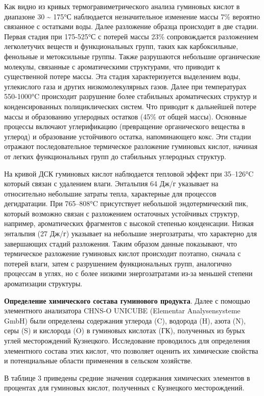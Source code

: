 \begin{multicols}{2}
Как видно из кривых термогравиметрического анализа гуминовых кислот в
диапазоне 30 \textasciitilde{} 175°С наблюдается незначительное
изменение массы 7\% вероятно связанное с остатками воды. Далее
разложение образца происходит в две стадии. Первая стадия при 175-525°С
с потерей массы 23\% сопровождается разложением легколетучих веществ и
функциональных групп, таких как карбоксильные, фенольные и метоксильные
группы. Также разрушаются небольшие органические молекулы, связанные с
ароматическими структурами, что приводит к существенной потере массы.
Эта стадия характеризуется выделением воды, углекислого газа и других
низкомолекулярных газов. Далее при температурах 550-1000°C происходит
разрушение более стабильных ароматических структур и конденсированных
полициклических систем. Что приводит к дальнейшей потере массы и
образованию углеродных остатков (45\% от общей массы). Основные процессы
включают углерификацию (превращение органического вещества в углерод) и
образование устойчивого остатка, напоминающего кокс. Эти стадии отражают
последовательное термическое разложение гуминовых кислот, начиная от
легких функциональных групп до стабильных углеродных структур.

На кривой ДСК гуминовых кислот наблюдается тепловой эффект при 35--126°C
который связан с удалением влаги. Энтальпия 64 Дж/г указывает на
относительно небольшие затраты тепла, характерные для процессов
дегидратации. При 765--808°C присутствует небольшой эндотермический пик,
который возможно связан с разложением остаточных устойчивых структур,
например, ароматических фрагментов с высокой степенью конденсации.
Низкая энтальпия (27 Дж/г) указывает на небольшие энергозатраты, что
характерно для завершающих стадий разложения. Таким образом данные
показывают, что термическое разложение гуминовых кислот происходит
поэтапно, сначала с потерей влаги, затем с разрушением функциональных
групп, аналогично процессам в углях, но с более низкими энергозатратами
из-за меньшей степени ароматизации структуры.

{\bfseries Определение химического состава гуминового продукта}. Далее с
помощью элементного анализатора CHNS-O UNICUBE (Elementar
Analysensysteme GmbH) были определены содержания углерода (C), водорода
(H), азота (N), серы (S) и кислорода (O) в гуминовых кислотах (ГК),
полученных из бурых углей месторождений Кузнецкого. Исследование
проводилось для определения элементного состава этих кислот, что
позволяет оценить их химические свойства и потенциальные области
применения в сельском хозяйстве.

В таблице 3 приведены средние значения содержания химических элементов в
процентах для гуминовых кислот, полученных с Кузнецкого месторождений.
\end{multicols}

